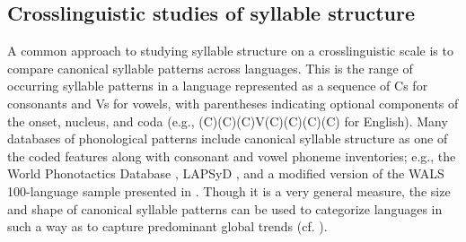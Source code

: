 \subsection{Crosslinguistic studies of syllable structure}\label{sec:3.1.1}

  A common approach to studying syllable structure on a crosslinguistic scale is to compare canonical syllable patterns across languages. This is the range of occurring syllable patterns in a language represented as a sequence of Cs for consonants and Vs for vowels, with parentheses indicating optional components of the onset, nucleus, and coda (e.g., (C)(C)(C)V(C)(C)(C)(C) for English). Many databases of phonological patterns include canonical syllable structure as one of the coded features along with consonant and vowel phoneme inventories; e.g.,  the World Phonotactics Database \citep{DonohueEtAl2013}, LAPSyD \citep{MaddiesonEtAl2013}, and a modified version of the WALS 100-language sample presented in \citet{Gordon2016}. Though it is a very general measure, the size and shape of canonical syllable patterns can be used to categorize languages in such a way as to capture predominant global trends (cf. \citealt{Maddieson2013a}).

